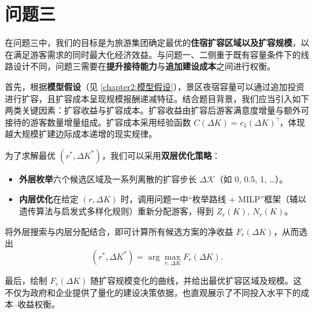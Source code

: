 \section[\hspace{-2pt}问题三]{{\heiti{} \hspace{-8pt}问题三}}\label{section1: 问题三}

在问题三中，我们的目标是为旅游集团确定最优的\textbf{住宿扩容区域以及扩容规模}，以在满足游客需求的同时最大化经济效益。与问题一、二侧重于既有容量条件下的线路设计不同，问题三需要在\textbf{提升接待能力}与\textbf{追加建设成本}之间进行权衡。

首先，根据\textbf{模型假设}（见 \ref{chapter2:模型假设}），景区夜宿容量可以通过追加投资进行扩容，且扩容成本呈现规模报酬递减特征。结合题目背景，我们应当引入如下两类关键因素：扩容收益与扩容成本。扩容收益由扩容后游客满意度增量与额外可接待的游客数量增量组成。扩容成本采用经验函数 $C(\Delta K)=c_{1}(\Delta K)^{\gamma}$，体现越大规模扩建边际成本递增的现实规律。




为了求解最优 $(r^{*},\Delta K^{*})$，我们可以采用\textbf{双层优化策略}：

\begin{itemize}
  \item \textbf{外层枚举}\;六个候选区域及一系列离散的扩容步长 $\Delta\mathcal K$（如 0, 0.5, 1, \dots）。
  \item \textbf{内层优化}\;在给定 $(r,\Delta K)$ 时，调用问题一中“枚举路线 + MILP”框架（辅以遗传算法与启发式多样化规则）重新分配游客，得到 $Z_r(K),\,N_r(K)$。
\end{itemize}

将外层搜索与内层分配结合，即可计算所有候选方案的净收益 $F_r(\Delta K)$，从而选出
\[
  (r^{*},\Delta K^{*})=\arg\max_{r,\,\Delta K} F_r(\Delta K).
\]

最后，绘制 $F_r(\Delta K)$ 随扩容规模变化的曲线，并给出最优扩容区域及规模。这不仅为政府和企业提供了量化的建设决策依据，也直观展示了不同投入水平下的成本–收益权衡。



